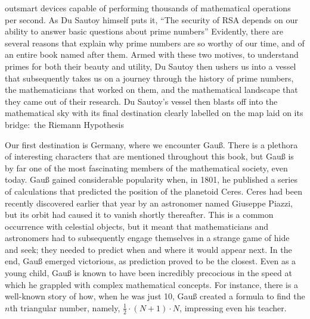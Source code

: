 \documentclass{mathbook}
\begin{document}
outsmart devices capable of performing thousands of mathematical operations per second. As Du Sautoy himself puts it, ``The security of RSA depends on our ability to answer basic questions about prime numbers'' \cite[p.~12]{Sautoy2003} Evidently, there are several reasons that explain why prime numbers are so worthy of our time, and of an entire book named after them. Armed with these two motives, to understand primes for both their beauty and utility, Du Sautoy then ushers us into a vessel that subsequently takes us on a journey through the history of prime numbers, the mathematicians that worked on them, and the mathematical landscape that they came out of their research. Du Sautoy's vessel then blasts off into the mathematical sky with its final destination clearly labelled on the map laid on its bridge:~the Riemann Hypothesis
    
    Our first destination is Germany, where we encounter Gauß. There is a plethora of interesting characters that are mentioned throughout this book, but Gauß is by far one of the most fascinating members of the mathematical society, even today. Gauß gained considerable popularity when, in 1801, he published a series of calculations that predicted the position of the planetoid Ceres. \cite[p.~19]{Sautoy2003} Ceres had been recently discovered earlier that year by an astronomer named Giuseppe Piazzi, but its orbit had caused it to vanish shortly thereafter. This is a common occurrence with celestial objects, but it meant that mathematicians and astronomers had to subsequently engage themselves in a strange game of hide and seek; they needed to predict when and where it would appear next. In the end, Gauß emerged victorious, as prediction proved to be the closest. \cite{Weiss1999} Even as a young child, Gauß is known to have been incredibly precocious in the speed at which he grappled with complex mathematical concepts. For instance, there is a well-known story of how, when he was just 10, Gauß created a formula to find the \(n\)th triangular number, namely, \(\frac{1}{2} \cdot (N + 1) \cdot N\), impressing even his teacher.  \cite[p.~25]{Sautoy2003}
\end{document}
